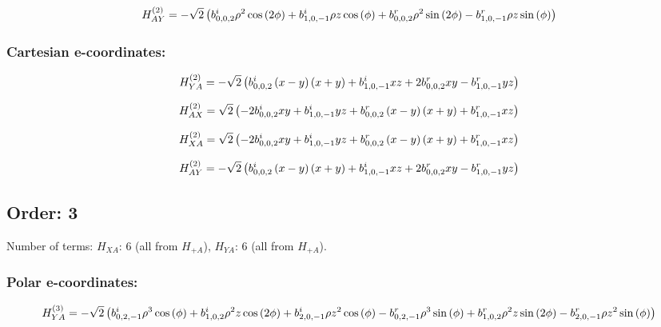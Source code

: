 \documentclass[fleqn]{article}
\begin{document}
\begin{dmath*}
H_{AY}^{(2)}=-  \sqrt{2} \left( b^{i}_{0,0,2} \rho^{2} \cos{\left (2 \phi \right )} +  b^{i}_{1,0,-1} \rho z \cos{\left (\phi \right )} +  b^{r}_{0,0,2} \rho^{2} \sin{\left (2 \phi \right )} -  b^{r}_{1,0,-1} \rho z \sin{\left (\phi \right )}\right)\\
\end{dmath*}
\subsubsection*{Cartesian e-coordinates:}

\begin{dmath*}
H_{YA}^{(2)}=-  \sqrt{2} \left( b^{i}_{0,0,2} \left(x - y\right) \left(x + y\right) +  b^{i}_{1,0,-1} x z + 2 b^{r}_{0,0,2} x y -  b^{r}_{1,0,-1} y z\right)\\
\end{dmath*}

\begin{dmath*}
H_{AX}^{(2)}=\sqrt{2} \left(- 2 b^{i}_{0,0,2} x y + b^{i}_{1,0,-1} y z + b^{r}_{0,0,2} \left(x - y\right) \left(x + y\right) + b^{r}_{1,0,-1} x z\right)\\
\end{dmath*}

\begin{dmath*}
H_{XA}^{(2)}=\sqrt{2} \left(- 2 b^{i}_{0,0,2} x y + b^{i}_{1,0,-1} y z + b^{r}_{0,0,2} \left(x - y\right) \left(x + y\right) + b^{r}_{1,0,-1} x z\right)\\
\end{dmath*}

\begin{dmath*}
H_{AY}^{(2)}=-  \sqrt{2} \left( b^{i}_{0,0,2} \left(x - y\right) \left(x + y\right) +  b^{i}_{1,0,-1} x z + 2 b^{r}_{0,0,2} x y -  b^{r}_{1,0,-1} y z\right)\\
\end{dmath*}
\subsection{Order: 3}
Number of terms: $H_{XA}$: $6$ (all from $H_{+A}$), $H_{YA}$: $6$ (all from $H_{+A}$).
\subsubsection*{Polar e-coordinates:}

\begin{dmath*}
H_{YA}^{(3)}=-  \sqrt{2} \left( b^{i}_{0,2,-1} \rho^{3} \cos{\left (\phi \right )} +  b^{i}_{1,0,2} \rho^{2} z \cos{\left (2 \phi \right )} +  b^{i}_{2,0,-1} \rho z^{2} \cos{\left (\phi \right )} -  b^{r}_{0,2,-1} \rho^{3} \sin{\left (\phi \right )} +  b^{r}_{1,0,2} \rho^{2} z \sin{\left (2 \phi \right )} -  b^{r}_{2,0,-1} \rho z^{2} \sin{\left (\phi \right )}\right)\\
\end{dmath*}
\end{document}
